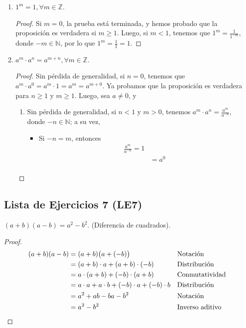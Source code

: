 \documentclass[11pt]{article}
\newcommand{\N}{\mathbb{N}}
\newcommand{\Z}{\mathbb{Z}}
\begin{document}
 \begin{enumerate}[label=\alph*)]
  \item $1^m = 1, \forall m\in \Z$. \begin{proof}
    Si $m=0$, la prueba está terminada, y hemos probado que la proposición es verdadera si $m\geq 1$. Luego, si $m<1$, tenemos que $1^m = \frac{1}{1^{-m}}$, donde $-m\in \N$, por lo que $1^m = \frac{1}{1} = 1$.
  \end{proof}

  \item $a^m\cdot a^n = a^{m+n}, \forall m\in \Z$. \begin{proof}
    Sin pérdida de generalidad, si $n=0$, tenemos que $a^m\cdot a^0 = a^m \cdot 1 = a^m = a^{m+0}$. Ya probamos que la proposición es verdadera para $n\geq 1$ y $m\geq 1$. Luego, sea $a\neq 0$, y \begin{enumerate}[label=\roman*)]
      \item Sin pérdida de generalidad, si $n<1$ y $m>0$, tenemos $a^m\cdot a^n = \frac{a^m}{a^{-n}}$, donde $-n\in \N$; a su vez, \begin{itemize}
        \item Si $-n = m$, entonces \begin{align*}
          \frac{a^m}{a^{-n}} = 1 \\
          &= a^0\\
        \end{align*}
      \end{itemize}
    \end{enumerate}
    
  \end{proof}

 \end{enumerate}

\subsection*{Lista de Ejercicios 7 (LE7)}

$(a+b)(a-b)=a^2-b^2$. (Diferencia de cuadrados).
\begin{proof} 
 \begin{align*}
 (a+b)(a-b) &= (a+b)\bigl(a+(-b)\bigr) && \text{Notación}\\
 &= (a+b)\cdot a + (a+b)\cdot (-b) && \text{Distribución}\\
 &= a\cdot (a+b) + (-b)\cdot (a+b) && \text{Conmutatividad}\\
 &= a\cdot a + a\cdot b + (-b)\cdot a + (-b) \cdot b && \text{Distribución}\\
 &= a^2+ ab -ba -b^2 && \text{Notación}\\
 &=a^2-b^2 && \text{Inverso aditivo} \qedhere
 \end{align*} 
\end{proof}
\end{document}
